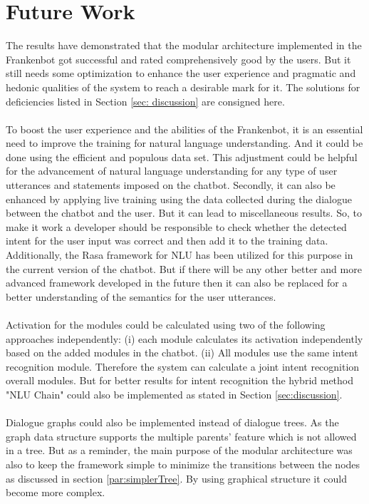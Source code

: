 \section{Future Work}
The results have demonstrated that the modular architecture implemented in the Frankenbot got successful and rated comprehensively good by the users. But it still needs some optimization to enhance the user experience and pragmatic and hedonic qualities of the system to reach a desirable mark for it. The solutions for deficiencies listed in Section \ref{sec: discussion} are consigned here.
\\~\\
To boost the user experience and the abilities of the Frankenbot, it is an essential need to improve the training for natural language understanding. And it could be done using the efficient and populous data set. This adjustment could be helpful for the advancement of natural language understanding for any type of user utterances and statements imposed on the chatbot. Secondly, it can also be enhanced by applying live training using the data collected during the dialogue between the chatbot and the user. But it can lead to miscellaneous results. So, to make it work a developer should be responsible to check whether the detected intent for the user input was correct and then add it to the training data. Additionally, the Rasa framework for NLU has been utilized for this purpose in the current version of the chatbot. But if there will be any other better and more advanced framework developed in the future then it can also be replaced for a better understanding of the semantics for the user utterances.
\\~\\
Activation for the modules could be calculated using two of the following approaches independently: (i) each module calculates its activation independently based on the added modules in the chatbot. (ii) All modules use the same intent recognition module. Therefore the system can calculate a joint intent recognition overall modules. But for better results for intent recognition the hybrid method "NLU Chain" could also be implemented as stated in Section \ref{sec:discussion}. 
\\~\\
Dialogue graphs could also be implemented instead of dialogue trees. As the graph data structure supports the multiple parents' feature which is not allowed in a tree. But as a reminder, the main purpose of the modular architecture was also to keep the framework simple to minimize the transitions between the nodes as discussed in section \ref{par:simplerTree}. By using graphical structure it could become more complex.

